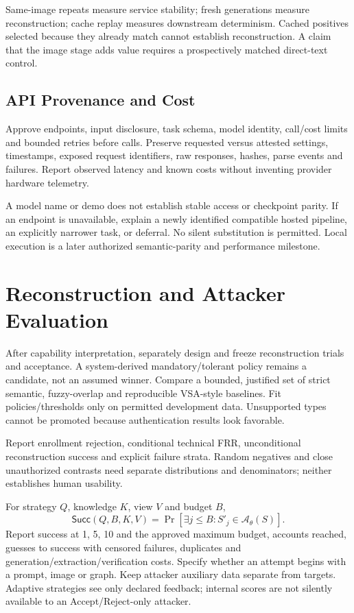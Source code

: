 \documentclass[compsoc,conference,a4paper,10pt,times]{IEEEtran}
\begin{document}
Same-image repeats measure service stability; fresh generations measure reconstruction; cache replay measures downstream determinism. Cached positives selected because they already match cannot establish reconstruction. A claim that the image stage adds value requires a prospectively matched direct-text control.

\subsection{API Provenance and Cost}
Approve endpoints, input disclosure, task schema, model identity, call/cost limits and bounded retries before calls. Preserve requested versus attested settings, timestamps, exposed request identifiers, raw responses, hashes, parse events and failures. Report observed latency and known costs without inventing provider hardware telemetry.

A model name or demo does not establish stable access or checkpoint parity. If an endpoint is unavailable, explain a newly identified compatible hosted pipeline, an explicitly narrower task, or deferral. No silent substitution is permitted. Local execution is a later authorized semantic-parity and performance milestone.

\section{Reconstruction and Attacker Evaluation}
\label{sec:security}
After capability interpretation, separately design and freeze reconstruction trials and acceptance. A system-derived mandatory/tolerant policy remains a candidate, not an assumed winner. Compare a bounded, justified set of strict semantic, fuzzy-overlap and reproducible VSA-style baselines. Fit policies/thresholds only on permitted development data. Unsupported types cannot be promoted because authentication results look favorable.

Report enrollment rejection, conditional technical FRR, unconditional reconstruction success and explicit failure strata. Random negatives and close unauthorized contrasts need separate distributions and denominators; neither establishes human usability.

For strategy $Q$, knowledge $K$, view $V$ and budget $B$,
\begin{equation}
 \mathsf{Succ}(Q,B,K,V)=
 \Pr[\exists j\leq B:S'_j\in\mathcal{A}_{\theta}(S)].
\end{equation}
Report success at 1, 5, 10 and the approved maximum budget, accounts reached, guesses to success with censored failures, duplicates and generation/extraction/verification costs. Specify whether an attempt begins with a prompt, image or graph. Keep attacker auxiliary data separate from targets. Adaptive strategies see only declared feedback; internal scores are not silently available to an Accept/Reject-only attacker.
\end{document}
